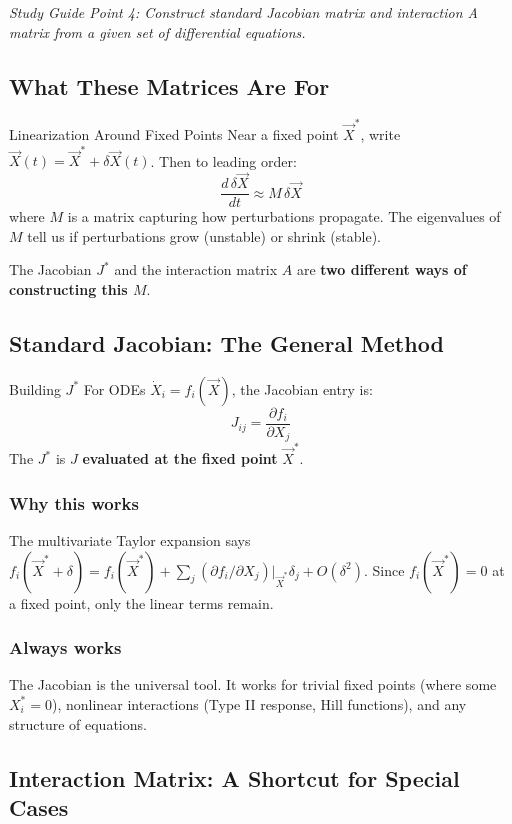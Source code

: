 \documentclass[11pt]{article}
\begin{document}
\textit{Study Guide Point 4: Construct standard Jacobian matrix and interaction A matrix from a given set of differential equations.}

\subsection{What These Matrices Are For}

\begin{conceptbox}{Linearization Around Fixed Points}
Near a fixed point $\vec X^*$, write $\vec X(t) = \vec X^* + \delta\vec X(t)$. Then to leading order:
\[
\frac{d\,\delta \vec X}{dt} \approx M \, \delta\vec X
\]
where $M$ is a matrix capturing how perturbations propagate. The eigenvalues of $M$ tell us if perturbations grow (unstable) or shrink (stable).

The Jacobian $J^*$ and the interaction matrix $A$ are \textbf{two different ways of constructing this $M$}.
\end{conceptbox}

\subsection{Standard Jacobian: The General Method}

\begin{conceptbox}{Building $J^*$}
For ODEs $\dot X_i = f_i(\vec X)$, the Jacobian entry is:
\[
J_{ij} = \frac{\partial f_i}{\partial X_j}
\]
The $J^*$ is $J$ \textbf{evaluated at the fixed point} $\vec X^*$.
\end{conceptbox}

\subsubsection{Why this works} The multivariate Taylor expansion says
$f_i(\vec X^* + \delta) = f_i(\vec X^*) + \sum_j (\partial f_i/\partial X_j)|_{\vec X^*} \delta_j + O(\delta^2)$. Since $f_i(\vec X^*) = 0$ at a fixed point, only the linear terms remain.

\subsubsection{Always works} The Jacobian is the universal tool. It works for trivial fixed points (where some $X_i^* = 0$), nonlinear interactions (Type II response, Hill functions), and any structure of equations.

\subsection{Interaction Matrix: A Shortcut for Special Cases}
\end{document}
